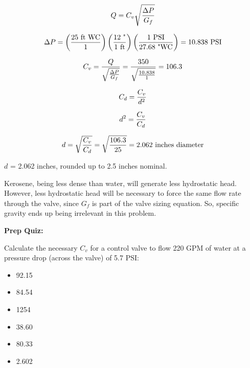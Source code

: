
$$Q = C_v \sqrt{\Delta P \over G_f}$$

$$\Delta P = \left(25 \hbox{ ft WC} \over 1 \right) \left(12 \hbox{ "} \over 1 \hbox{ ft} \right) \left(1 \hbox{ PSI} \over 27.68 \hbox{ "WC} \right) = 10.838 \hbox{ PSI}$$

$$C_v = {Q \over \sqrt{\Delta P \over G_f}} = {350 \over \sqrt{10.838 \over 1}} = 106.3$$

\vskip 10pt

$$C_d = {C_v \over d^2}$$

$$d^2 = {C_v \over C_d}$$

$$d = \sqrt{C_v \over C_d} = \sqrt{106.3 \over 25} = 2.062 \hbox{ inches diameter}$$

\vskip 10pt

$d$ = 2.062 inches, rounded up to 2.5 inches nominal.

\vskip 10pt

Kerosene, being less dense than water, will generate less hydrostatic head.  However, less hydrostatic head will be necessary to force the same flow rate through the valve, since $G_f$ is part of the valve sizing equation.  So, specific gravity ends up being irrelevant in this problem.

\vfil \eject

\noindent
{\bf Prep Quiz:}

Calculate the necessary $C_v$ for a control valve to flow 220 GPM of water at a pressure drop (across the valve) of 5.7 PSI:

\begin{itemize}
\item{} 92.15
\vskip 5pt 
\item{} 84.54
\vskip 5pt 
\item{} 1254
\vskip 5pt 
\item{} 38.60
\vskip 5pt 
\item{} 80.33
\vskip 5pt 
\item{} 2.602
\end{itemize}




